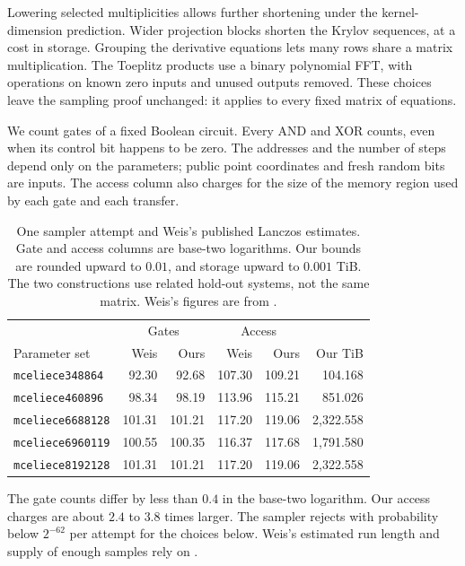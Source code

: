 \documentclass[b5paper, 10pt, abstract=true, captions=tableheading]{scrartcl}
\theoremstyle{plain}
\theoremstyle{definition}
\begin{document}
Lowering selected multiplicities allows further shortening under the
kernel-dimension prediction. Wider projection blocks shorten the Krylov
sequences, at a cost in storage. Grouping the
derivative equations lets many rows share a matrix multiplication.
The Toeplitz products use a binary polynomial FFT, with operations on
known zero inputs and unused outputs removed. These choices leave the
sampling proof unchanged: it applies to every fixed matrix of equations.

We count gates of a fixed Boolean circuit. Every AND and XOR counts,
even when its control bit happens to be zero. The addresses and the
number of steps depend only on the parameters; public point coordinates
and fresh random bits are inputs. The access column also charges for the
size of the memory region used by each gate and each transfer.

\begin{table}[htbp]
\centering\small\setlength{\tabcolsep}{3pt}
\caption{One sampler attempt and Weis's published Lanczos estimates.
Gate and access columns are base-two logarithms. Our bounds are rounded
upward to $0.01$, and storage upward to $0.001$ TiB. The two constructions
use related hold-out systems, not the same matrix. Weis's figures are
from \cite[Tables 4--5 and Appendix E]{Weis2026}.}
\label{tab:wopt-optimized-comparison}
\begin{tabular}{@{}lrrrrr@{}}
\toprule
 &\multicolumn{2}{c}{Gates}&\multicolumn{2}{c}{Access}&\\
Parameter set & Weis & Ours & Weis & Ours & Our TiB\\
\midrule
\texttt{mceliece348864}&92.30&92.68&107.30&109.21&104.168\\
\texttt{mceliece460896}&98.34&98.19&113.96&115.21&851.026\\
\texttt{mceliece6688128}&101.31&101.21&117.20&119.06&2,322.558\\
\texttt{mceliece6960119}&100.55&100.35&116.37&117.68&1,791.580\\
\texttt{mceliece8192128}&101.31&101.21&117.20&119.06&2,322.558\\
\bottomrule
\end{tabular}
\end{table}

The gate counts differ by less than $0.4$ in the base-two logarithm.
Our access charges are about $2.4$ to $3.8$ times larger. The sampler
rejects with probability below $2^{-62}$ per attempt for the choices
below. Weis's estimated run length and supply of enough samples rely on
\cite[Assumption 4]{Weis2026}.
\end{document}
